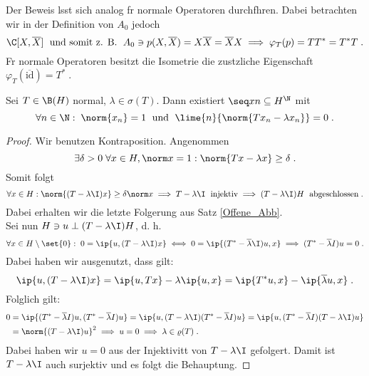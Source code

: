 	\begin{rem}
	  Der Beweis l\as sst sich analog f\us r normale Operatoren durchf\us hren. Dabei betrachten wir in der Definition von $A_0$ jedoch 
	  \[\C[X, \overline X] \;\text{ und somit z. B. }\; A_0 \ni p(X, \overline X) = X\overline X = \overline X X \implies \varphi_T(p) = TT^* = T^*T\;.\]
	  F\us r normale Operatoren besitzt die Isometrie die zus\as tzliche Eigenschaft
	  \(\varphi_T(\overline {\text{id}}) = T^*\;.\)
	\begin{lemma}
		\label{spektrum_normal}
		Sei \(T\in \B(H)\) normal, \(\lambda \in \sigma(T)\). Dann existiert \(\seq xn \subseteq H^\N\) mit 
		\[\forall n \in \N: \; \norm{x_n} = 1 \;\text{ und }\;  \lime{n}{\norm{Tx_n - \lambda x_n}} = 0\;.\]
	\end{lemma}
	\begin{proof}
		Wir benutzen Kontraposition. Angenommen
		\[\exists \delta > 0 \;\forall x \in H, \norm x = 1: \norm{Tx - \lambda x } \geq \delta\;.\]
		Somit folgt
		\[\forall x \in H: \norm{(T-\lambda \I)x} \geq \delta \norm x \implies  T -\lambda \I \;\text{ injektiv} \implies (T-\lambda\I)H \;\text{ abgeschlossen}\;.\]
		Dabei erhalten wir die letzte Folgerung aus Satz \ref{Offene_Abb}.\\
		Sei nun \(H \ni u \perp (T-\lambda\I)H\), d. h. 
		\[\forall x\in H\setminus\set{0}:\; 0 = \ip{u, (T-\lambda\I)x} \iff 0  = \ip{(T^* - \overline\lambda \I)u,x}  \implies  (T^* -\overline \lambda I) u = 0\;.\]
		Dabei haben wir ausgenutzt, dass gilt:
		\[ \ip{u, (T-\lambda\I)x}  = \ip{u,Tx} - \lambda \ip{u,x} = \ip{T^* u, x} - \ip{\overline\lambda u,x}\;. \]
		Folglich gilt:
		\begin{align*}0 &= \ip{(T^* -\overline \lambda I) u,(T^* -\overline \lambda I) u} = \ip{u, (T-\lambda\I)(T^* -\overline \lambda I) u} = \ip{u, (T^* -\overline \lambda I)(T-\lambda\I) u} \\
		&= \norm{(T-\lambda\I)u}^2 \implies u=0 \implies \lambda \in \varrho(T)\;.
		\end{align*}
		Dabei haben wir \(u=0\) aus der Injektivit\as t von \(T-\lambda\I\) gefolgert. Damit ist \(T-\lambda\I\) auch surjektiv und es folgt die Behauptung.
	\end{proof}
	

\end{rem}
